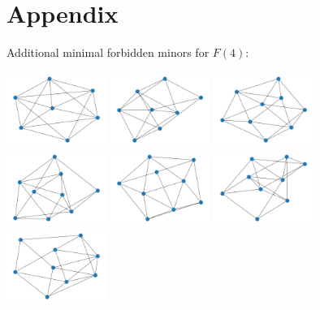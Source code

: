 \newpage
\section*{Appendix}

Additional minimal forbidden minors for $F(4)$: \par
\includegraphics[width=3.25cm]{images/mfms/f4_2.png}
\includegraphics[width=3.25cm]{images/mfms/f4_4.png}
\includegraphics[width=3.25cm]{images/mfms/f4_6.png}
\includegraphics[width=3.25cm]{images/mfms/f4_7.png}
\includegraphics[width=3.25cm]{images/mfms/f4_8.png}
\includegraphics[width=3.25cm]{images/mfms/f4_10.png}
\includegraphics[width=3.25cm]{images/mfms/f4_11.png}

